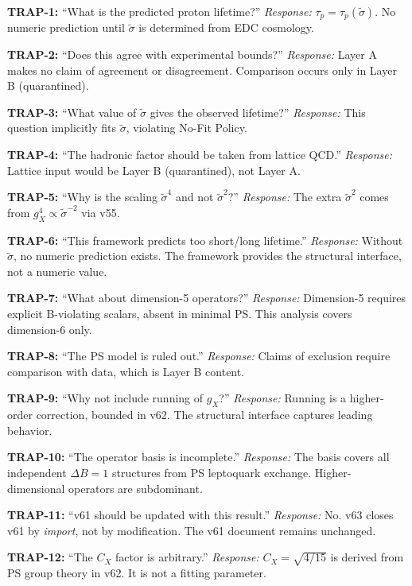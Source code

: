 \documentclass[11pt,a4paper]{article}
\theoremstyle{definition}
\begin{document}
\begin{trapbox}
\textbf{TRAP-1:} ``What is the predicted proton lifetime?''
\textit{Response:} $\tau_p = \tau_p(\tilde{\sigma})$. No numeric prediction until
$\tilde{\sigma}$ is determined from EDC cosmology.

\textbf{TRAP-2:} ``Does this agree with experimental bounds?''
\textit{Response:} Layer A makes no claim of agreement or disagreement. Comparison
occurs only in Layer B (quarantined).

\textbf{TRAP-3:} ``What value of $\tilde{\sigma}$ gives the observed lifetime?''
\textit{Response:} This question implicitly fits $\tilde{\sigma}$, violating No-Fit Policy.

\textbf{TRAP-4:} ``The hadronic factor should be taken from lattice QCD.''
\textit{Response:} Lattice input would be Layer B (quarantined), not Layer A.

\textbf{TRAP-5:} ``Why is the scaling $\tilde{\sigma}^4$ and not $\tilde{\sigma}^2$?''
\textit{Response:} The extra $\tilde{\sigma}^2$ comes from $g_X^4 \propto \tilde{\sigma}^{-2}$ via v55.

\textbf{TRAP-6:} ``This framework predicts too short/long lifetime.''
\textit{Response:} Without $\tilde{\sigma}$, no numeric prediction exists. The framework
provides the structural interface, not a numeric value.

\textbf{TRAP-7:} ``What about dimension-5 operators?''
\textit{Response:} Dimension-5 requires explicit B-violating scalars, absent in minimal PS.
This analysis covers dimension-6 only.

\textbf{TRAP-8:} ``The PS model is ruled out.''
\textit{Response:} Claims of exclusion require comparison with data, which is Layer B content.

\textbf{TRAP-9:} ``Why not include running of $g_X$?''
\textit{Response:} Running is a higher-order correction, bounded in v62. The structural
interface captures leading behavior.

\textbf{TRAP-10:} ``The operator basis is incomplete.''
\textit{Response:} The basis covers all independent $\Delta B = 1$ structures from
PS leptoquark exchange. Higher-dimensional operators are subdominant.

\textbf{TRAP-11:} ``v61 should be updated with this result.''
\textit{Response:} No. v63 closes v61 by \emph{import}, not by modification.
The v61 document remains unchanged.

\textbf{TRAP-12:} ``The $C_X$ factor is arbitrary.''
\textit{Response:} $C_X = \sqrt{4/15}$ is derived from PS group theory in v62.
It is not a fitting parameter.
\end{trapbox}
\end{document}

